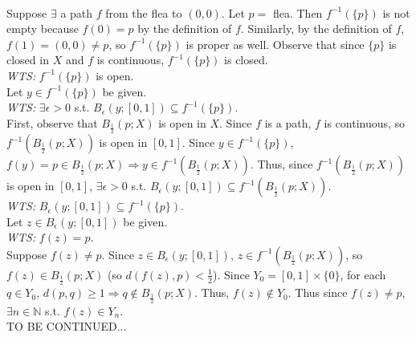 \documentclass[12pt]{article}
\begin{document}
\\Suppose $\exists$ a  path $f$ from the flea to $(0,0)$. Let $p =$ flea. Then $f^{-1}(\{p\})$ is not empty because $f(0) = p$ by the definition of $f$. Similarly, by the definition of $f$, $f(1) = (0,0) \neq p$, so $f^{-1}(\{p\})$ is proper as well. Observe that since $\{p\}$ is closed in $X$ and $f$ is continuous, $f^{-1}(\{p\})$ is closed.
\\ \emph{WTS:} $f^{-1}(\{p\})$ is open. 
\\Let $y \in f^{-1}(\{p\})$ be given. 
\\ \emph{WTS:} $\exists \epsilon > 0$ s.t. $B_{\epsilon}(y; [0,1]) \subseteq f^{-1}(\{p\})$.
\\First, observe that $B_{\frac{1}{2}}(p; X)$ is open in $X$. Since $f$ is a path, $f$ is continuous, so $f^{-1}(B_{\frac{1}{2}}(p; X))$ is open in $[0,1]$. Since $y \in f^{-1}(\{p\})$, $f(y) = p \in B_{\frac{1}{2}}(p; X) \Rightarrow y \in f^{-1}(B_{\frac{1}{2}}(p; X))$. Thus, since $f^{-1}(B_{\frac{1}{2}}(p; X))$ is open in $[0,1]$, $\exists \epsilon > 0$ s.t. $B_{\epsilon}(y; [0,1]) \subseteq f^{-1}(B_{\frac{1}{2}}(p; X))$.
\\ \emph{WTS:} $B_{\epsilon}(y; [0,1]) \subseteq f^{-1}(\{p\})$.
\\Let $z \in B_{\epsilon}(y; [0,1])$ be given.
\\ \emph{WTS:} $f(z) = p$.
\\Suppose $f(z) \neq p$. Since $z \in B_{\epsilon}(y; [0,1])$, $z \in f^{-1}(B_{\frac{1}{2}}(p; X))$, so $f(z) \in B_{\frac{1}{2}}(p; X)$ (so $d(f(z), p) < \frac{1}{2}$). Since $Y_0 = [0,1] \times \{0\}$, for each $q \in Y_0$, $d(p,q) \geq 1 \Rightarrow q \not\in B_{\frac{1}{2}}(p; X)$. Thus, $f(z) \not\in Y_0$. Thus since $f(z) \neq p$, $\exists n \in \mathbb{N}$ s.t. $f(z) \in Y_n$.
\\TO BE CONTINUED...
\end{document}

